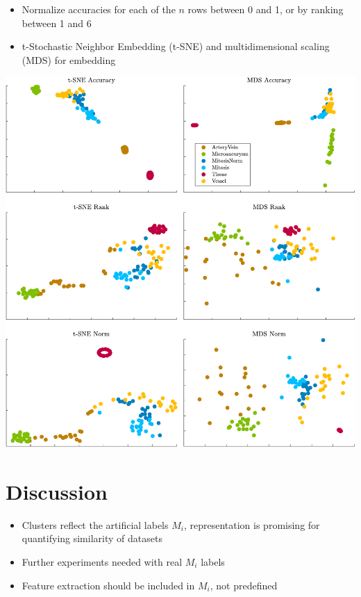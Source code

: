 \documentclass[a4paper,11pt]{article}
\begin{document}
\begin{slidetop}
\begin{multicols}{2}
\begin{itemize}
\item Normalize accuracies for each of the $n$ rows between 0 and 1, or by ranking between 1 and 6

\item t-Stochastic Neighbor Embedding (t-SNE) and multidimensional scaling (MDS) for embedding


\end{itemize}



\begin{center}
	\includegraphics[width=0.8\columnwidth]{embedding.pdf}
  \label{fig:example}
\end{center}



\section*{Discussion}

\begin{itemize}

\item Clusters reflect the artificial labels $M_i$, representation is promising for quantifying similarity of datasets

\item Further experiments needed with real $M_i$ labels

\item Feature extraction should be included in $M_i$, not predefined


\end{itemize}
\end{multicols}
\end{slidetop}
\end{document}
